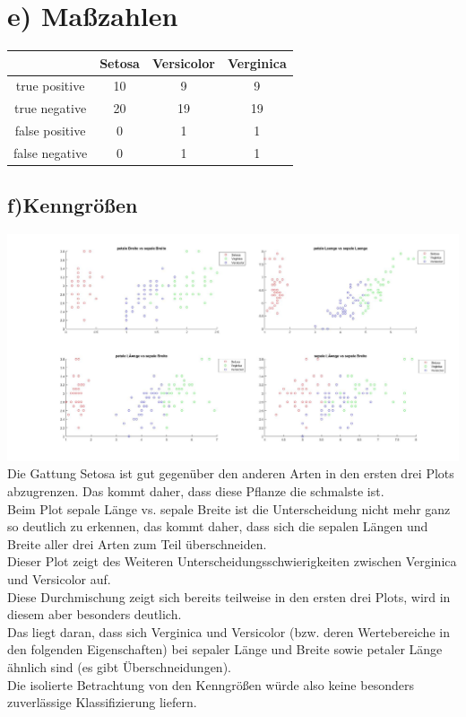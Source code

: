\documentclass{scrartcl}
\begin{document}
\section*{e) Maßzahlen}
\begin{tabular}{|c|c|c|c|}
	\hline
	&	Setosa	&	Versicolor	&	Verginica\\ 
	\hline
	true positive  & 10	&9	&9\\
	true negative  & 20	&19	&19\\
	false positive & 0	&1	&1\\
	false negative & 0	&1	&1\\
	\hline
\end{tabular}

\subsection*{f)Kenngrößen}
\includegraphics[width=1.1\textwidth]{plots/plotF.jpg} \\ 

Die Gattung Setosa ist gut gegenüber den anderen Arten in den ersten drei Plots abzugrenzen.
Das kommt daher, dass diese Pflanze die schmalste ist. \\
Beim Plot sepale Länge vs. sepale Breite ist die Unterscheidung nicht mehr ganz so deutlich zu erkennen, das kommt daher, dass sich die sepalen Längen und Breite aller drei Arten zum Teil überschneiden.\\
Dieser Plot zeigt des Weiteren Unterscheidungsschwierigkeiten zwischen Verginica und Versicolor auf. \\
Diese Durchmischung zeigt sich bereits teilweise in den ersten drei Plots, wird in diesem aber besonders deutlich. \\
Das liegt daran, dass sich Verginica und Versicolor (bzw. deren Wertebereiche in den folgenden Eigenschaften) bei sepaler Länge und Breite sowie petaler Länge ähnlich sind (es gibt Überschneidungen).\\
Die isolierte Betrachtung von den Kenngrößen würde also keine besonders zuverlässige Klassifizierung liefern.
\end{document}
